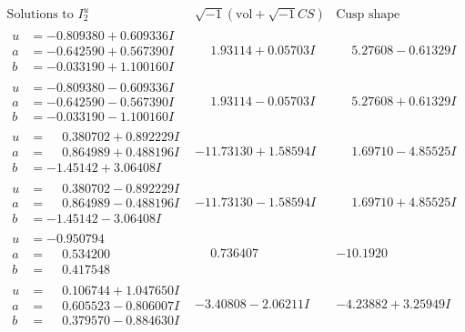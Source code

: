\documentclass[1p]{elsarticle_modified}
\theoremstyle{definition}
\newcommand{\I}{\sqrt{-1}}
\begin{document}
$$\begin{array}{c|c|c}  
\text{Solutions to }I^u_{2}& \I (\text{vol} + \sqrt{-1}CS) & \text{Cusp shape}\\
 \hline 
\begin{aligned}
u &= -0.809380 + 0.609336 I \\
a &= -0.642590 + 0.567390 I \\
b &= -0.033190 + 1.100160 I\end{aligned}
 & \phantom{-}1.93114 + 0.05703 I & \phantom{-}5.27608 - 0.61329 I \\ \hline\begin{aligned}
u &= -0.809380 - 0.609336 I \\
a &= -0.642590 - 0.567390 I \\
b &= -0.033190 - 1.100160 I\end{aligned}
 & \phantom{-}1.93114 - 0.05703 I & \phantom{-}5.27608 + 0.61329 I \\ \hline\begin{aligned}
u &= \phantom{-}0.380702 + 0.892229 I \\
a &= \phantom{-}0.864989 + 0.488196 I \\
b &= -1.45142 + 3.06408 I\end{aligned}
 & -11.73130 + 1.58594 I & \phantom{-}1.69710 - 4.85525 I \\ \hline\begin{aligned}
u &= \phantom{-}0.380702 - 0.892229 I \\
a &= \phantom{-}0.864989 - 0.488196 I \\
b &= -1.45142 - 3.06408 I\end{aligned}
 & -11.73130 - 1.58594 I & \phantom{-}1.69710 + 4.85525 I \\ \hline\begin{aligned}
u &= -0.950794\phantom{ +0.000000I} \\
a &= \phantom{-}0.534200\phantom{ +0.000000I} \\
b &= \phantom{-}0.417548\phantom{ +0.000000I}\end{aligned}
 & \phantom{-}0.736407\phantom{ +0.000000I} & -10.1920\phantom{ +0.000000I} \\ \hline\begin{aligned}
u &= \phantom{-}0.106744 + 1.047650 I \\
a &= \phantom{-}0.605523 - 0.806007 I \\
b &= \phantom{-}0.379570 - 0.884630 I\end{aligned}
 & -3.40808 - 2.06211 I & -4.23882 + 3.25949 I \\ \hline\begin{aligned}

\end{aligned}
\end{array}$$
\end{document}
